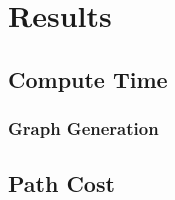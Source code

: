 \section{Results}



                                                                   
                                                                   

\subsection{Compute Time}

\subsubsection{Graph Generation}


\subsection{Path Cost}